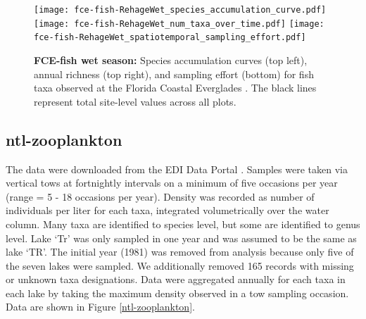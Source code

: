 \documentclass[11pt, oneside]{article}
\begin{document}
\begin{figure}[h!]
\centering
\texttt{[image: fce-fish-RehageWet\_species\_accumulation\_curve.pdf]}
\texttt{[image: fce-fish-RehageWet\_num\_taxa\_over\_time.pdf]}
\texttt{[image: fce-fish-RehageWet\_spatiotemporal\_sampling\_effort.pdf]}
\caption{{\bf FCE-fish wet season:} Species accumulation curves (top left),  annual richness (top right), and sampling effort (bottom)  for fish taxa observed at the Florida Coastal Everglades . The black lines represent total site-level values across all plots.}
\label{fce-fish-wet}
\end{figure}





\subsection {ntl-zooplankton}
The data were downloaded from the EDI Data Portal \citep{ntl-zooplankton}.
Samples were taken  via vertical tows at fortnightly intervals on a minimum of five occasions per year (range = 5 - 18 occasions per year).
Density was recorded as number of individuals per liter for each taxa, integrated volumetrically over the water column.
Many taxa are identified to species level, but some are identified to genus level.
Lake `Tr'  was only sampled in one year and was assumed to be the same as lake `TR'. %
The initial year (1981) was removed from analysis because only five of the seven lakes were sampled.
We additionally removed 165 records with missing or unknown taxa designations.
Data were aggregated annually for each taxa in each lake by taking the maximum density observed in a tow sampling occasion.
Data are shown in Figure \ref{ntl-zooplankton}.
\end{document}
